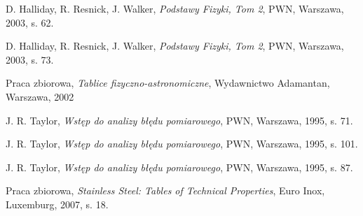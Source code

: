 \documentclass[10pt,a4paper]{article}
\begin{document}
\begin{center}
\begin{thebibliography}{9}

 D. Halliday, R. Resnick, J. Walker,
  \emph{Podstawy Fizyki, Tom 2},
  PWN, Warszawa, 2003, s. 62.
 
 D. Halliday, R. Resnick, J. Walker,
  \emph{Podstawy Fizyki, Tom 2},
  PWN, Warszawa, 2003, s. 73.
 
 Praca zbiorowa,
  \emph{Tablice fizyczno-astronomiczne},
  Wydawnictwo Adamantan, Warszawa, 2002
  
 J. R. Taylor,
 \emph{Wstęp do analizy błędu pomiarowego},
 PWN, Warszawa, 1995, s. 71.
 
 J. R. Taylor,
 \emph{Wstęp do analizy błędu pomiarowego},
 PWN, Warszawa, 1995, s. 101.
 
 J. R. Taylor,
 \emph{Wstęp do analizy błędu pomiarowego},
 PWN, Warszawa, 1995, s. 87.
 
 Praca zbiorowa,
 \emph{Stainless Steel: Tables of Technical Properties},
 Euro Inox, Luxemburg, 2007, s. 18.

\end{thebibliography}
\end{center}
 
\end{document}

